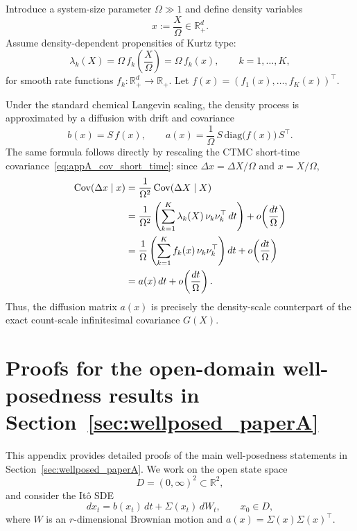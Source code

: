 \documentclass[pdflatex,sn-mathphys-ay]{sn-jnl}
\theoremstyle{thmstyleone}
\theoremstyle{definition}
\theoremstyle{remark}
\begin{document}
\begin{appendices}
Introduce a system-size parameter \(\Omega\gg 1\) and define density variables
\[
x:=\frac{X}{\Omega}\in\mathbb R_+^d.
\]
Assume density-dependent propensities of Kurtz type:
\begin{equation}\label{eq:appA_density_dependent_prop}
\lambda_k(X)
=
\Omega\,f_k\!\left(\frac{X}{\Omega}\right)
=
\Omega\,f_k(x),
\qquad k=1,\dots,K,
\end{equation}
for smooth rate functions \(f_k:\mathbb R_+^d\to\mathbb R_+\). Let \(f(x)=(f_1(x),\dots,f_K(x))^\top\).

Under the standard chemical Langevin scaling, the density process is approximated by a diffusion with drift and covariance
\begin{equation}\label{eq:appA_drift_diff_density}
b(x)=S\,f(x),
\qquad
a(x)=\frac{1}{\Omega}\,S\,\mathrm{diag}\big(f(x)\big)\,S^\top.
\end{equation}
The same formula follows directly by rescaling the CTMC short-time covariance~\eqref{eq:appA_cov_short_time}: since \(\Delta x=\Delta X/\Omega\) and $x = X/\Omega$, 
\begin{align}
\mathrm{Cov}(\Delta x\mid x)
&=
\frac{1}{\Omega^2}\,\mathrm{Cov}(\Delta X\mid X)\notag\\
&=
\frac{1}{\Omega^2}
\left(
\sum_{k=1}^K \lambda_k(X)\,\nu_k\nu_k^\top\,dt
\right)
+o\!\left(\frac{dt}{\Omega}\right)\notag\\
&=
\frac{1}{\Omega}
\left(
\sum_{k=1}^K f_k(x)\,\nu_k\nu_k^\top
\right)dt
+o\!\left(\frac{dt}{\Omega}\right)\notag\\
&=
a(x)\,dt+o\!\left(\frac{dt}{\Omega}\right). \label{eq:appA_cov_density_scale}
\end{align}
Thus, the diffusion matrix \(a(x)\) is precisely the density-scale counterpart of the exact count-scale infinitesimal covariance \(G(X)\).

\section{Proofs for the open-domain well-posedness results in Section~\ref{sec:wellposed_paperA}}
\label{app:wellposedness_proofs}

This appendix provides detailed proofs of the main well-posedness statements in Section~\ref{sec:wellposed_paperA}. We work on the open state space
\[
D=(0,\infty)^2\subset\mathbb R^2,
\]
and consider the It\^o SDE
\begin{equation}
\label{eq:appC_sde}
dx_t=b(x_t)\,dt+\Sigma(x_t)\,dW_t,\qquad x_0\in D,
\end{equation}
where \(W\) is an \(r\)-dimensional Brownian motion and \(a(x)=\Sigma(x)\Sigma(x)^\top\).


\end{appendices}
\end{document}
